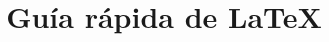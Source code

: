 \documentclass{doc}
\title{Guía rápida de \LaTeX{}}
\begin{document}
\makedocheader







\printbibliography
\end{document}
